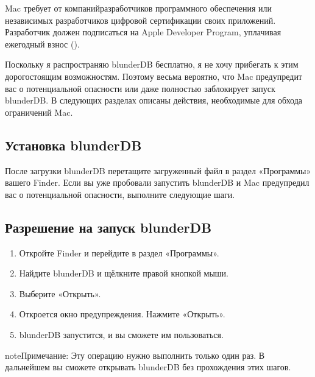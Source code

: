 \documentclass[letterpaper,10pt,russian]{sphinxmanual}
\begin{document}
\sphinxAtStartPar
Mac требует от компаний\sphinxhyphen{}разработчиков программного обеспечения или независимых разработчиков цифровой сертификации своих приложений. Разработчик должен подписаться на Apple Developer Program, уплачивая ежегодный взнос ().

\sphinxAtStartPar
Поскольку я распространяю blunderDB бесплатно, я не хочу прибегать к этим дорогостоящим возможностям. Поэтому весьма вероятно, что Mac предупредит вас о потенциальной опасности или даже полностью заблокирует запуск blunderDB. В следующих разделах описаны действия, необходимые для обхода ограничений Mac.


\subsection{Установка blunderDB}
\label{\detokenize{annexe_mac_securite:installation-de-blunderdb}}
\sphinxAtStartPar
После загрузки blunderDB перетащите загруженный файл в раздел «Программы» вашего Finder. Если вы уже пробовали запустить blunderDB и Mac предупредил вас о потенциальной опасности, выполните следующие шаги.


\subsection{Разрешение на запуск blunderDB}
\label{\detokenize{annexe_mac_securite:autorisation-de-l-execution-de-blunderdb}}\begin{enumerate}
%
\item {} 
\sphinxAtStartPar
Откройте Finder и перейдите в раздел «Программы».

\item {} 
\sphinxAtStartPar
Найдите blunderDB и щёлкните правой кнопкой мыши.

\item {} 
\sphinxAtStartPar
Выберите «Открыть».

\item {} 
\sphinxAtStartPar
Откроется окно предупреждения. Нажмите «Открыть».

\item {} 
\sphinxAtStartPar
blunderDB запустится, и вы сможете им пользоваться.

\end{enumerate}

\begin{sphinxadmonition}{note}{Примечание:}
\sphinxAtStartPar
Эту операцию нужно выполнить только один раз. В дальнейшем вы сможете открывать blunderDB без прохождения этих шагов.
\end{sphinxadmonition}
\end{document}

